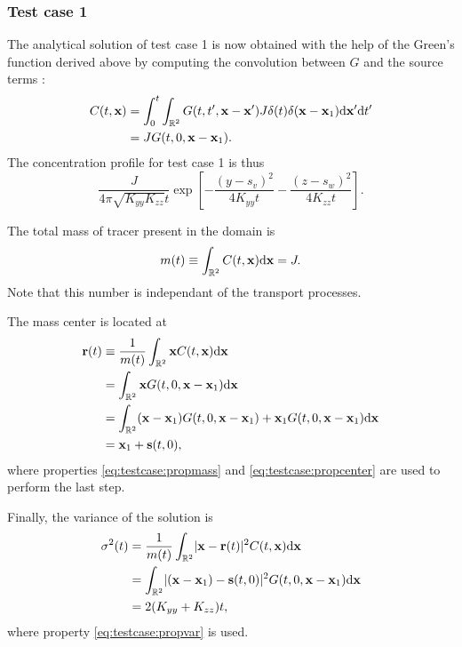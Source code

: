 \subsubsection*{Test case 1}
The analytical solution of test case 1 is now obtained with the help of the Green's function derived above by computing the convolution between $G$ and the source terms :
\begin{align}
	C(t,\b x) &= \int_{0}^{t} \int_{\R[2]} G(t,t',\b x - \b x') J \delta(t) \delta(\b x- \b x_1) \rm d \b{x}' \rm dt'\nonumber\\
	&= J G(t,0,\b x - \b x_1).
\end{align}
The concentration profile for test case 1 is thus
\begin{equation}
	\frac{J}{4\pi\sqrt{K_{yy}K_{zz}}t}\exp\left[-\frac{(y-s_v)^2}{4K_{yy}t} -\frac{(z-s_w)^2}{4K_{zz}t} \right].
\end{equation}

The total mass of tracer present in the domain is
\begin{equation}
	m(t) \equiv \int_{\R[2]} C(t,\b x) \rm d \b x = J.
\end{equation}
Note that this number is independant of the transport processes.

The mass center is located at
\begin{align}
	\b r(t) &\equiv \frac{1}{m(t)} \int_{\R[2]} \b x C(t,\b x) \rm d \b x \nonumber \\
	&= \int_{\R[2]} \b x G(t,0,\b x - \b x_1) \rm d \b x \nonumber\\
	&= \int_{\R[2]} (\b x-\b x_1) G(t,0,\b x - \b x_1) + \b x_1 G(t,0,\b x - \b x_1) \rm d \b x\nonumber\\
	&= \b x_1 + \b s(t,0),
\end{align}
where properties \eqref{eq:testcase:propmass} and \eqref{eq:testcase:propcenter} are used to perform the last step.

Finally, the variance of the solution is
\begin{align}
	\sigma^2(t) &= \frac{1}{m(t)} \int_{\R[2]} \lvert \b x - \b r(t) \rvert^2 C(t,\b x) \rm d \b x \nonumber \\
	&= \int_{\R[2]} \lvert (\b x - \b x_1) - \b s(t,0)\rvert^2 G(t,0,\b x - \b x_1) \rm d \b x \nonumber \\
	&= 2(K_{yy}+K_{zz})t,
\end{align}
where property \eqref{eq:testcase:propvar} is used.

